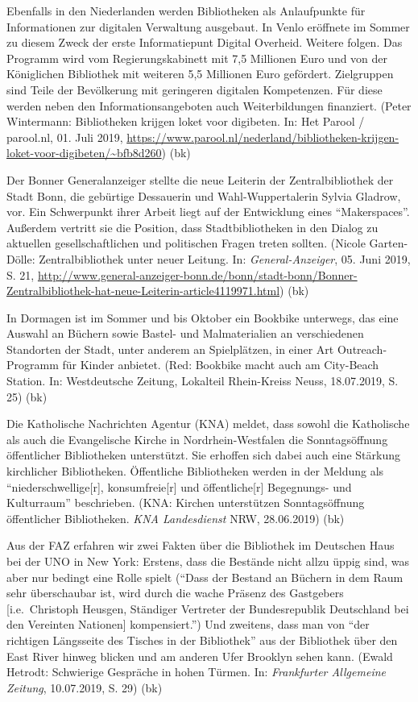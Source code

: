 \documentclass[a4paper,
fontsize=11pt,
oneside,
numbers=noperiodatend,
parskip=half-,
bibliography=totoc,
final
]{scrartcl}
\begin{document}
Ebenfalls in den Niederlanden werden Bibliotheken als Anlaufpunkte für
Informationen zur digitalen Verwaltung ausgebaut. In Venlo eröffnete im
Sommer zu diesem Zweck der erste Informatiepunt Digital Overheid.
Weitere folgen. Das Programm wird vom Regierungskabinett mit 7,5
Millionen Euro und von der Königlichen Bibliothek mit weiteren 5,5
Millionen Euro gefördert. Zielgruppen sind Teile der Bevölkerung mit
geringeren digitalen Kompetenzen. Für diese werden neben den
Informationsangeboten auch Weiterbildungen finanziert. (Peter
Wintermann: Bibliotheken krijgen loket voor digibeten. In: Het Parool /
parool.nl, 01. Juli 2019,
\url{https://www.parool.nl/nederland/bibliotheken-krijgen-loket-voor-digibeten/~bfb8d260})
(bk)

Der Bonner Generalanzeiger stellte die neue Leiterin der
Zentralbibliothek der Stadt Bonn, die gebürtige Dessauerin und
Wahl-Wuppertalerin Sylvia Gladrow, vor. Ein Schwerpunkt ihrer Arbeit
liegt auf der Entwicklung eines \enquote{Makerspaces}. Außerdem vertritt
sie die Position, dass Stadtbibliotheken in den Dialog zu aktuellen
gesellschaftlichen und politischen Fragen treten sollten. (Nicole
Garten-Dölle: Zentralbibliothek unter neuer Leitung. In:
\emph{General-Anzeiger}, 05. Juni 2019, S. 21,
\url{http://www.general-anzeiger-bonn.de/bonn/stadt-bonn/Bonner-Zentralbibliothek-hat-neue-Leiterin-article4119971.html})
(bk)

In Dormagen ist im Sommer und bis Oktober ein Bookbike unterwegs, das
eine Auswahl an Büchern sowie Bastel- und Malmaterialien an
verschiedenen Standorten der Stadt, unter anderem an Spielplätzen, in
einer Art Outreach-Programm für Kinder anbietet. (Red: Bookbike macht
auch am City-Beach Station. In: Westdeutsche Zeitung, Lokalteil
Rhein-Kreiss Neuss, 18.07.2019, S. 25) (bk)

Die Katholische Nachrichten Agentur (KNA) meldet, dass sowohl die
Katholische als auch die Evangelische Kirche in Nordrhein-Westfalen die
Sonntagsöffnung öffentlicher Bibliotheken unterstützt. Sie erhoffen sich
dabei auch eine Stärkung kirchlicher Bibliotheken. Öffentliche
Bibliotheken werden in der Meldung als \enquote{niederschwellige{[}r{]},
konsumfreie{[}r{]} und öffentliche{[}r{]} Begegnungs- und Kulturraum}
beschrieben. (KNA: Kirchen unterstützen Sonntagsöffnung öffentlicher
Bibliotheken. \emph{KNA Landesdienst} NRW, 28.06.2019) (bk)

Aus der FAZ erfahren wir zwei Fakten über die Bibliothek im Deutschen
Haus bei der UNO in New York: Erstens, dass die Bestände nicht allzu
üppig sind, was aber nur bedingt eine Rolle spielt (\enquote{Dass der
Bestand an Büchern in dem Raum sehr überschaubar ist, wird durch die
wache Präsenz des Gastgebers {[}i.e.~Christoph Heusgen, Ständiger
Vertreter der Bundesrepublik Deutschland bei den Vereinten Nationen{]}
kompensiert.}) Und zweitens, dass man von \enquote{der richtigen
Längsseite des Tisches in der Bibliothek} aus der Bibliothek über den
East River hinweg blicken und am anderen Ufer Brooklyn sehen kann.
(Ewald Hetrodt: Schwierige Gespräche in hohen Türmen. In:
\emph{Frankfurter Allgemeine Zeitung}, 10.07.2019, S. 29) (bk)
\end{document}
